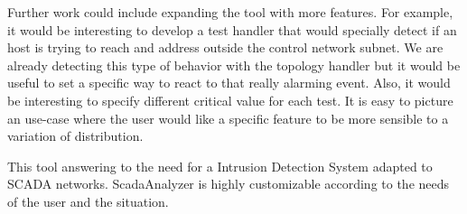 \documentclass[12pt,journal,compsoc]{IEEEtran}
\begin{document}
\begin{empfile}
Further work could include expanding the tool with more features. For example, it would be interesting to develop a test handler that would specially detect if an host is trying to reach and address outside the control network subnet. We are already detecting this type of behavior with the topology handler but it would be useful to set a specific way to react to that really alarming event. Also, it would be interesting to specify different critical value for each test. It is easy to picture an use-case where the user would like a specific feature to be more sensible to a variation of distribution. 

This tool answering to the need for a Intrusion Detection System adapted to SCADA networks. ScadaAnalyzer is highly customizable according to the needs of the user and the situation. 



%


\appendices



\ifCLASSOPTIONcaptionsoff
  \newpage
\fi




\end{empfile}
\end{document}
